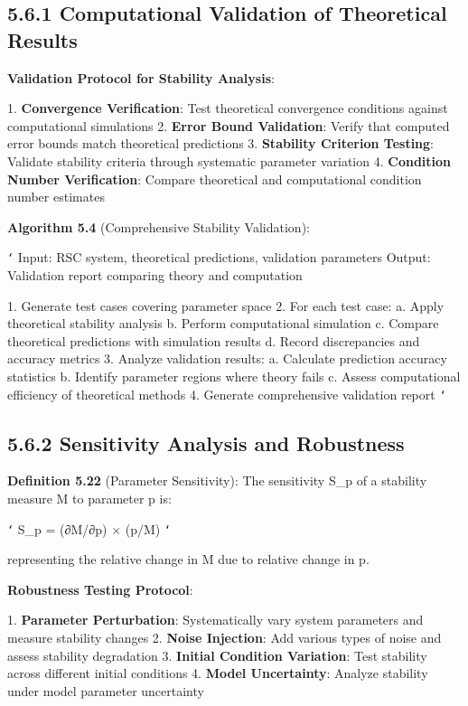 \subsection{5.6.1 Computational Validation of Theoretical Results}

\textbf{Validation Protocol for Stability Analysis}:

1. \textbf{Convergence Verification}: Test theoretical convergence conditions against computational simulations
2. \textbf{Error Bound Validation}: Verify that computed error bounds match theoretical predictions
3. \textbf{Stability Criterion Testing}: Validate stability criteria through systematic parameter variation
4. \textbf{Condition Number Verification}: Compare theoretical and computational condition number estimates

\textbf{Algorithm 5.4} (Comprehensive Stability Validation):

\texttt{`}
Input: RSC system, theoretical predictions, validation parameters
Output: Validation report comparing theory and computation

1. Generate test cases covering parameter space
2. For each test case:
   a. Apply theoretical stability analysis
   b. Perform computational simulation
   c. Compare theoretical predictions with simulation results
   d. Record discrepancies and accuracy metrics
3. Analyze validation results:
   a. Calculate prediction accuracy statistics
   b. Identify parameter regions where theory fails
   c. Assess computational efficiency of theoretical methods
4. Generate comprehensive validation report
\texttt{`}

\subsection{5.6.2 Sensitivity Analysis and Robustness}

\textbf{Definition 5.22} (Parameter Sensitivity): The sensitivity S_p of a stability measure M to parameter p is:

\texttt{`}
S_p = (∂M/∂p) × (p/M)
\texttt{`}

representing the relative change in M due to relative change in p.

\textbf{Robustness Testing Protocol}:

1. \textbf{Parameter Perturbation}: Systematically vary system parameters and measure stability changes
2. \textbf{Noise Injection}: Add various types of noise and assess stability degradation
3. \textbf{Initial Condition Variation}: Test stability across different initial conditions
4. \textbf{Model Uncertainty}: Analyze stability under model parameter uncertainty

